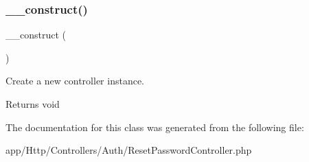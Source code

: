 \subsubsection{\texorpdfstring{\+\_\+\+\_\+construct()}{\_\_construct()}}
{\footnotesize\ttfamily \+\_\+\+\_\+construct (\begin{DoxyParamCaption}{ }\end{DoxyParamCaption})}

Create a new controller instance.

\begin{DoxyReturn}{Returns}
void 
\end{DoxyReturn}


The documentation for this class was generated from the following file\+:\begin{DoxyCompactItemize}
\item 
app/\+Http/\+Controllers/\+Auth/Reset\+Password\+Controller.\+php\end{DoxyCompactItemize}
